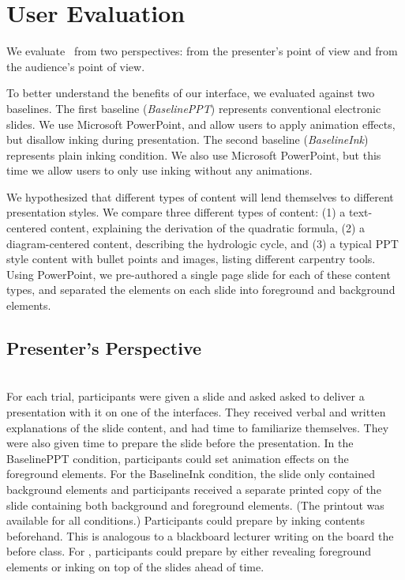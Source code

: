 \section{User Evaluation}

We evaluate \interface\ from two perspectives: from the presenter's point of view and from the audience's point of view. 


To better understand the benefits of our interface, we evaluated \interface against two baselines. The first baseline (\textit{BaselinePPT}) represents conventional electronic slides. We use Microsoft PowerPoint, and allow users to apply animation effects, but disallow inking during presentation. The second baseline (\textit{BaselineInk}) represents plain inking condition. We also use Microsoft PowerPoint, but this time we allow users to only use inking without any animations. 

We hypothesized that different types of content will lend themselves to different presentation styles. We compare three different types of content: (1) a text-centered content, explaining the derivation of the quadratic formula, (2) a diagram-centered content, describing the hydrologic cycle, and (3) a typical PPT style content with bullet points and images, listing different carpentry tools. Using PowerPoint, we pre-authored a single page slide for each of these content types, and separated the elements on each slide into foreground and background elements.  

\subsection{Presenter's Perspective}\\
For each trial, participants were given a slide and asked asked to deliver a presentation with it on one of the interfaces. They received verbal and written explanations of the slide content, and had time to familiarize themselves. They were also given time to prepare the slide before the presentation. In the BaselinePPT condition, participants could set animation effects on the foreground elements. For the BaselineInk condition, the slide only contained background elements  and participants received a separate printed copy of the slide containing both background and foreground elements. (The printout was available for all conditions.) Participants could prepare by inking contents beforehand. This is analogous to a blackboard lecturer writing on the board the before class. For \interface, participants could prepare by either revealing foreground elements or inking on top of the slides ahead of time. 

